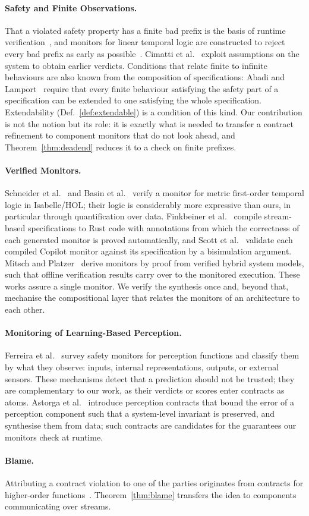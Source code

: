 \paragraph{Safety and Finite Observations.} That a violated safety property has a finite bad prefix is the basis of runtime verification~\cite{KupfermanVardi2001}, and monitors for linear temporal logic are constructed to reject every bad prefix as early as possible~\cite{BauerLeuckerSchallhart2011}. Cimatti et al.~\cite{Cimatti2024} exploit assumptions on the system to obtain earlier verdicts. Conditions that relate finite to infinite behaviours are also known from the composition of specifications: Abadi and Lamport~\cite{AbadiLamport1995} require that every finite behaviour satisfying the safety part of a specification can be extended to one satisfying the whole specification. Extendability (Def.~\ref{def:extendable}) is a condition of this kind. Our contribution is not the notion but its role: it is exactly what is needed to transfer a contract refinement to component monitors that do not look ahead, and Theorem~\ref{thm:deadend} reduces it to a check on finite prefixes.

\paragraph{Verified Monitors.} Schneider et al.~\cite{Schneider2019} and Basin et al.~\cite{Basin2020} verify a monitor for metric first-order temporal logic in Isabelle/HOL; their logic is considerably more expressive than ours, in particular through quantification over data. Finkbeiner et al.~\cite{Finkbeiner2020} compile stream-based specifications to Rust code with annotations from which the correctness of each generated monitor is proved automatically, and Scott et al.~\cite{Scott2023} validate each compiled Copilot monitor against its specification by a bisimulation argument. Mitsch and Platzer~\cite{MitschPlatzer2016} derive monitors by proof from verified hybrid system models, such that offline verification results carry over to the monitored execution. These works assure a single monitor. We verify the synthesis once and, beyond that, mechanise the compositional layer that relates the monitors of an architecture to each other.

\paragraph{Monitoring of Learning-Based Perception.} Ferreira et al.~\cite{Ferreira2025} survey safety monitors for perception functions and classify them by what they observe: inputs, internal representations, outputs, or external sensors. These mechanisms detect that a prediction should not be trusted; they are complementary to our work, as their verdicts or scores enter contracts as atoms. Astorga et al.~\cite{Astorga2023} introduce perception contracts that bound the error of a perception component such that a system-level invariant is preserved, and synthesise them from data; such contracts are candidates for the guarantees our monitors check at runtime.

\paragraph{Blame.} Attributing a contract violation to one of the parties originates from contracts for higher-order functions~\cite{FindlerFelleisen2002}. Theorem~\ref{thm:blame} transfers the idea to components communicating over streams.
